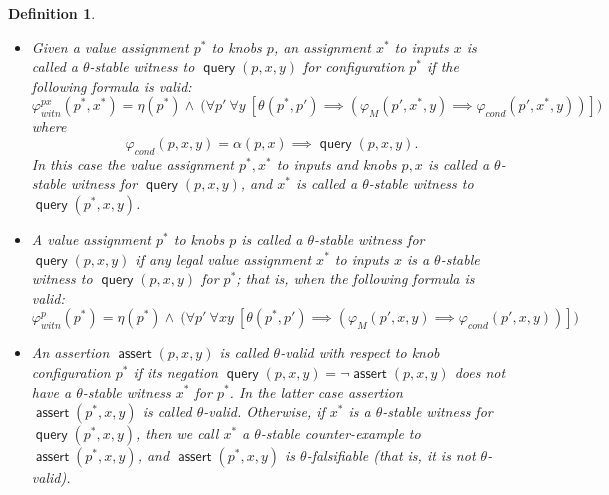 \documentclass[a4paper,parskip=half]{article} %
\newcommand*\eqdef=
\newcommand*\query{\operatorname{\mathsf{query}}}
\newcommand*\assert{\operatorname{\mathsf{assert}}}
\newtheorem{defn}[thm]{Definition}
\begin{document}
\begin{defn}\label{def:witness:validity}
\begin{itemize}
\item Given a value assignment $p^*$ to knobs $p$, an assignment $x^*$ to inputs $x$ is called a \emph{$\theta$-stable witness} 
to $\query(p,x,y)$ for configuration $p^*$ if the following formula is valid:
\begin{equation}\label{form:gear:certify:knobs:inputs}
\varphi_{\mathit{witn}}^{px}(p^*,x^*) \eqdef
     \eta(p^*) \wedge ~\big(
    \forall p'~
    \forall y~[
   \theta(p^*, p') \implies (\varphi_M(p',x^*,y)  \implies  \varphi_{\mathit{cond}}(p',x^*,y))
    ]\big)
\end{equation}
where \[\varphi_{\mathit{cond}}(p,x,y) \eqdef \alpha(p,x) \implies \query(p,x,y).\]
In this case the value assignment $p^*, x^*$ to inputs and knobs $p,x$ is called a  \emph{$\theta$-stable witness for $\query(p,x,y)$}, 
and $x^*$ is called a  \emph{$\theta$-stable witness to $\query(p^*,x,y)$}.
\item A value assignment $p^*$ to knobs $p$ is called a  \emph{$\theta$-stable witness for $\query(p,x,y)$} if any legal value assignment 
$x^*$ to inputs $x$ is a $\theta$-stable witness to $\query(p,x,y)$ for $p^*$; that is, when the following formula is valid:
\begin{equation}\label{form:gear:certify:knobs}
\varphi_{\mathit{witn}}^{p}(p^*) \eqdef
     \eta(p^*) \wedge ~\big(
    \forall p'~
    \forall xy~[
   \theta(p^*, p') \implies (\varphi_M(p',x,y)  \implies  \varphi_{\mathit{cond}}(p',x,y))
    ]\big)
\end{equation}
\item An assertion $\assert(p, x,y)$ is called \emph{$\theta$-valid with respect to knob configuration $p^*$} if its negation 
$\query(p, x,y) \eqdef \neg \assert(p, x,y)$ does not have a $\theta$-stable witness $x^*$ for $p^*$.  In the latter case  
assertion $\assert(p^*, x,y)$ is called \emph{$\theta$-valid}. Otherwise, if $x^*$ is a  $\theta$-stable witness for 
$\query(p^*, x,y)$, then we call $x^*$  a \emph{$\theta$-stable counter-example to  $\assert(p^*, x,y)$}, and 
$\assert(p^*, x,y)$ is \emph{$\theta$-falsifiable} (that is, it is not $\theta$-valid).
\end{itemize}
\end{defn}
\end{document}
